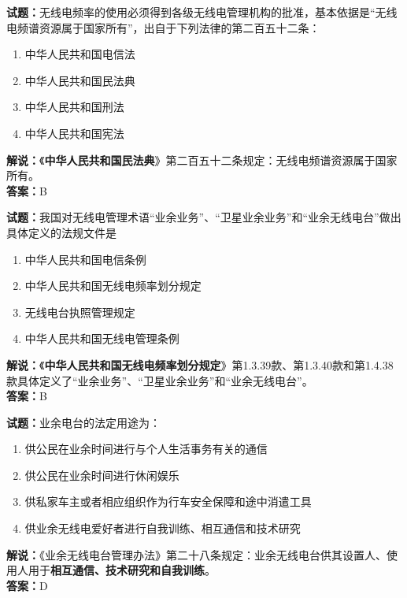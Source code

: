 \documentclass{ctexbook}
\begin{document}
\vspace{\baselineskip}

\noindent\textbf{试题：}无线电频率的使用必须得到各级无线电管理机构的批准，基本依据是“无线电频谱资源属于国家所有”，出自于下列法律的第二百五十二条：
\begin{enumerate}[leftmargin=3em]
  \item 中华人民共和国电信法
  \item 中华人民共和国民法典
  \item 中华人民共和国刑法
  \item 中华人民共和国宪法
\end{enumerate}
\noindent\textbf{解说：}《\textbf{中华人民共和国民法典}》第二百五十二条规定：无线电频谱资源属于国家所有。\\\noindent\textbf{答案：}B

\vspace{\baselineskip}

\noindent\textbf{试题：}我国对无线电管理术语“业余业务”、“卫星业余业务”和“业余无线电台”做出具体定义的法规文件是
\begin{enumerate}[leftmargin=3em]
  \item 中华人民共和国电信条例
  \item 中华人民共和国无线电频率划分规定
  \item 无线电台执照管理规定
  \item 中华人民共和国无线电管理条例
\end{enumerate}
\textbf{解说：}《\textbf{中华人民共和国无线电频率划分规定}》第1.3.39款、第1.3.40款和第1.4.38款具体定义了“业余业务”、“卫星业余业务”和“业余无线电台”。\\\noindent\textbf{答案：}B

\vspace{\baselineskip}

\noindent\textbf{试题：}业余电台的法定用途为：
\begin{enumerate}[leftmargin=3em]
  \item 供公民在业余时间进行与个人生活事务有关的通信
  \item 供公民在业余时间进行休闲娱乐
  \item 供私家车主或者相应组织作为行车安全保障和途中消遣工具
  \item 供业余无线电爱好者进行自我训练、相互通信和技术研究
\end{enumerate}
\noindent\textbf{解说：}《业余无线电台管理办法》第二十八条规定：业余无线电台供其设置人、使用人用于\textbf{相互通信、技术研究和自我训练}。\\\noindent\textbf{答案：}D
\end{document}
